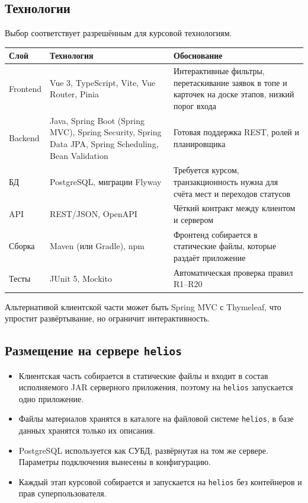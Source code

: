 \documentclass[a4paper,12pt]{article}
\begin{document}
\subsection{Технологии}
Выбор соответствует разрешённым для курсовой технологиям.
\begin{center}
\small
\begin{tabular}{|p{2.5cm}|p{6.2cm}|p{5.9cm}|}
\hline
\textbf{Слой} & \textbf{Технология} & \textbf{Обоснование}\\ \hline
Frontend & Vue 3, TypeScript, Vite, Vue Router, Pinia & Интерактивные фильтры, перетаскивание заявок в топе и карточек на доске этапов, низкий порог входа\\ \hline
Backend & Java, Spring Boot (Spring MVC), Spring Security, Spring Data JPA, Spring Scheduling, Bean Validation & Готовая поддержка REST, ролей и планировщика\\ \hline
БД & PostgreSQL, миграции Flyway & Требуется курсом, транзакционность нужна для счёта мест и переходов статусов\\ \hline
API & REST/JSON, OpenAPI & Чёткий контракт между клиентом и сервером\\ \hline
Сборка & Maven (или Gradle), npm & Фронтенд собирается в статические файлы, которые раздаёт приложение\\ \hline
Тесты & JUnit 5, Mockito & Автоматическая проверка правил R1–R20\\ \hline
\end{tabular}
\end{center}
Альтернативой клиентской части может быть Spring MVC с Thymeleaf, что упростит развёртывание, но ограничит интерактивность.

\subsection{Размещение на сервере \texttt{helios}}
\begin{itemize}
  \item Клиентская часть собирается в статические файлы и входит в состав исполняемого JAR серверного приложения, поэтому на \texttt{helios} запускается одно приложение.
  \item Файлы материалов хранятся в каталоге на файловой системе \texttt{helios}, в базе данных хранятся только их описания.
  \item PostgreSQL используется как СУБД, развёрнутая на том же сервере. Параметры подключения вынесены в конфигурацию.
  \item Каждый этап курсовой собирается и запускается на \texttt{helios} без контейнеров и прав суперпользователя.
\end{itemize}
\end{document}
